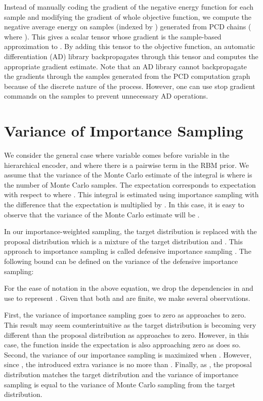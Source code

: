 \documentclass{article}
\begin{document}
Instead of manually coding the gradient of the negative energy function for each
sample and modifying the gradient of whole objective function, we compute the negative average energy on  samples (indexed by ) generated from PCD chains 
( where ). 
This gives a scalar tensor whose gradient is the sample-based approximation to . By adding this tensor to the objective 
function, an automatic differentiation (AD) library backpropagates through this tensor and computes the appropriate gradient 
estimate. Note that an AD library cannot backpropagate the gradients through the samples generated from the PCD computation graph because of the discrete 
nature of the process. However, one can use stop gradient commands on the samples to prevent unnecessary AD operations.

\iffalse
\section{Variance of Importance Sampling} \label{app:variance}

We consider the general case where variable  comes before variable  in the hierarchical encoder, and where there is a pairwise term
 in the RBM prior. We assume that the variance of the Monte Carlo estimate of the integral 
 is  where  is the number
of Monte Carlo samples. The expectation  corresponds to expectation with respect to  where .
This integral is estimated using importance sampling with the difference that the expectation is multiplied by .
In this case, it is easy to observe that the variance of the Monte Carlo estimate will be .

In our importance-weighted sampling, the target distribution  is replaced with the proposal distribution 
which is a mixture of the target distribution and . This approach to importance sampling is called defensive importance sampling \cite{hesterberg1988advances}.
The following bound can be defined on the variance of the defensive importance sampling:


For the ease of notation in the above equation, we drop the dependencies in  and use  to represent . Given that both  and  are finite, we make several observations.

First, the variance of importance sampling goes to zero as  approaches to zero.
This result may seem counterintuitive as the target distribution is becoming very different than the proposal distribution as  approaches to zero. However,
in this case, the function inside the expectation is also approaching zero as  does so. Second, the variance of our importance sampling is maximized when .
However, since , the introduced extra variance is no more than . Finally, as , the proposal distribution
matches the target distribution and the variance of importance sampling is equal to the variance of Monte Carlo sampling from the target distribution.
\end{document}
